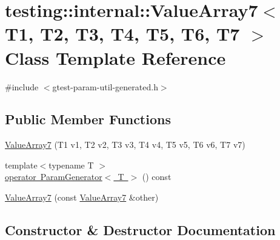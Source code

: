 \hypertarget{classtesting_1_1internal_1_1ValueArray7}{}\section{testing\+::internal\+::Value\+Array7$<$ T1, T2, T3, T4, T5, T6, T7 $>$ Class Template Reference}
\label{classtesting_1_1internal_1_1ValueArray7}


{\ttfamily \#include $<$gtest-\/param-\/util-\/generated.\+h$>$}

\subsection*{Public Member Functions}
\begin{DoxyCompactItemize}
\item 
\mbox{\hyperlink{classtesting_1_1internal_1_1ValueArray7_a34570dbbcc50d20f94e4a0c693e42f09}{Value\+Array7}} (T1 v1, T2 v2, T3 v3, T4 v4, T5 v5, T6 v6, T7 v7)
\item 
{\footnotesize template$<$typename T $>$ }\\\mbox{\hyperlink{classtesting_1_1internal_1_1ValueArray7_a4ab41f4a5687896e159c69f581d0a673}{operator Param\+Generator$<$ T $>$}} () const
\item 
\mbox{\hyperlink{classtesting_1_1internal_1_1ValueArray7_ab4be0da0f772c885c6fe681ea486ece4}{Value\+Array7}} (const \mbox{\hyperlink{classtesting_1_1internal_1_1ValueArray7}{Value\+Array7}} \&other)
\end{DoxyCompactItemize}


\subsection{Constructor \& Destructor Documentation}
\mbox{\label{classtesting_1_1internal_1_1ValueArray7_a34570dbbcc50d20f94e4a0c693e42f09}} 
